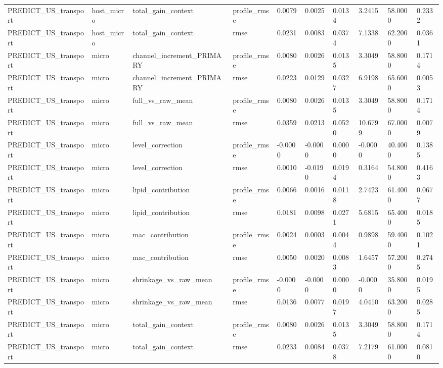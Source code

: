 {\begin{longtable}{llllllllll}
PREDICT\_US\_transport & host\_micro & total\_gain\_context & profile\_rmse & 0.0079 & 0.0025 & 0.0134 & 3.2415 & 58.0000 & 0.2332 \\
PREDICT\_US\_transport & host\_micro & total\_gain\_context & rmse & 0.0231 & 0.0083 & 0.0374 & 7.1338 & 62.2000 & 0.0361 \\
PREDICT\_US\_transport & micro & channel\_increment\_PRIMARY & profile\_rmse & 0.0080 & 0.0026 & 0.0135 & 3.3049 & 58.8000 & 0.1714 \\
PREDICT\_US\_transport & micro & channel\_increment\_PRIMARY & rmse & 0.0223 & 0.0129 & 0.0327 & 6.9198 & 65.6000 & 0.0053 \\
PREDICT\_US\_transport & micro & full\_vs\_raw\_mean & profile\_rmse & 0.0080 & 0.0026 & 0.0135 & 3.3049 & 58.8000 & 0.1714 \\
PREDICT\_US\_transport & micro & full\_vs\_raw\_mean & rmse & 0.0359 & 0.0213 & 0.0520 & 10.6799 & 67.0000 & 0.0079 \\
PREDICT\_US\_transport & micro & level\_correction & profile\_rmse & -0.0000 & -0.0000 & 0.0000 & -0.0000 & 40.4000 & 0.1385 \\
PREDICT\_US\_transport & micro & level\_correction & rmse & 0.0010 & -0.0190 & 0.0194 & 0.3164 & 54.8000 & 0.4163 \\
PREDICT\_US\_transport & micro & lipid\_contribution & profile\_rmse & 0.0066 & 0.0016 & 0.0118 & 2.7423 & 61.4000 & 0.0677 \\
PREDICT\_US\_transport & micro & lipid\_contribution & rmse & 0.0181 & 0.0098 & 0.0271 & 5.6815 & 65.4000 & 0.0185 \\
PREDICT\_US\_transport & micro & mac\_contribution & profile\_rmse & 0.0024 & 0.0003 & 0.0044 & 0.9898 & 59.4000 & 0.1021 \\
PREDICT\_US\_transport & micro & mac\_contribution & rmse & 0.0050 & 0.0020 & 0.0083 & 1.6457 & 57.2000 & 0.2745 \\
PREDICT\_US\_transport & micro & shrinkage\_vs\_raw\_mean & profile\_rmse & -0.0000 & -0.0000 & 0.0000 & -0.0000 & 35.8000 & 0.0195 \\
PREDICT\_US\_transport & micro & shrinkage\_vs\_raw\_mean & rmse & 0.0136 & 0.0077 & 0.0197 & 4.0410 & 63.2000 & 0.0285 \\
PREDICT\_US\_transport & micro & total\_gain\_context & profile\_rmse & 0.0080 & 0.0026 & 0.0135 & 3.3049 & 58.8000 & 0.1714 \\
PREDICT\_US\_transport & micro & total\_gain\_context & rmse & 0.0233 & 0.0084 & 0.0378 & 7.2179 & 61.0000 & 0.0810 \\

\end{longtable}}
